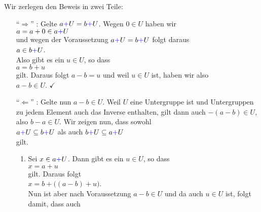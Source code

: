 \proof
Wir zerlegen den Beweis in zwei Teile:
\begin{enumerate}
\item[``$\Rightarrow$'']:
  Gelte $a {\color{blue}{+}} U = b {\color{blue}{+}} U$.  Wegen $0 \in U$ haben wir
  \\[0.2cm]
  \hspace*{1.3cm}
  $a = a + 0 \in a {\color{blue}{+}} U$
  \\[0.2cm]
  und wegen der Voraussetzung $a {\color{blue}{+}} U = b {\color{blue}{+}} U$ folgt daraus
  \\[0.2cm]
  \hspace*{1.3cm}
  $a \in b {\color{blue}{+}} U$.
  \\[0.2cm]
  Also gibt es ein $u \in U$, so dass
  \\[0.2cm]
  \hspace*{1.3cm}
  $a = b + u$
  \\[0.2cm]
  gilt.  Daraus folgt $a - b = u$ und weil $u \in U$ ist, haben wir also
  \\[0.2cm]
  \hspace*{1.3cm}
  $a - b \in U$.  $\checkmark$
\item[``$\Leftarrow$'']: Gelte nun $a - b \in U$.  Weil $U$ eine Untergruppe ist und Untergruppen zu jedem
  Element auch das Inverse enthalten, gilt dann auch $-(a -b) \in U$, also $b - a \in U$.  Wir zeigen
  nun, dass sowohl
  \\[0.2cm]
  \hspace*{1.3cm} 
  $a {\color{blue}{+}} U \subseteq b {\color{blue}{+}} U$ \quad als auch \quad
  $b {\color{blue}{+}} U \subseteq a {\color{blue}{+}} U$ 
  \\[0.2cm]
  gilt.
  \begin{enumerate}
  \item Sei $x \in a {\color{blue}{+}} U$.  Dann gibt es ein $u \in U$, so dass
        \\[0.2cm]
        \hspace*{1.3cm}
        $x = a + u$
        \\[0.2cm]
        gilt.  Daraus folgt
        \\[0.2cm]
        \hspace*{1.3cm}
        $x = b + \bigl((a - b) + u\bigr)$.
        \\[0.2cm]
        Nun ist aber nach Voraussetzung $a - b \in U$ und da auch $u \in U$ ist, folgt damit, dass auch
        \\[0.2cm]
        \hspace*{1.3cm}

\end{enumerate}
\end{enumerate}
